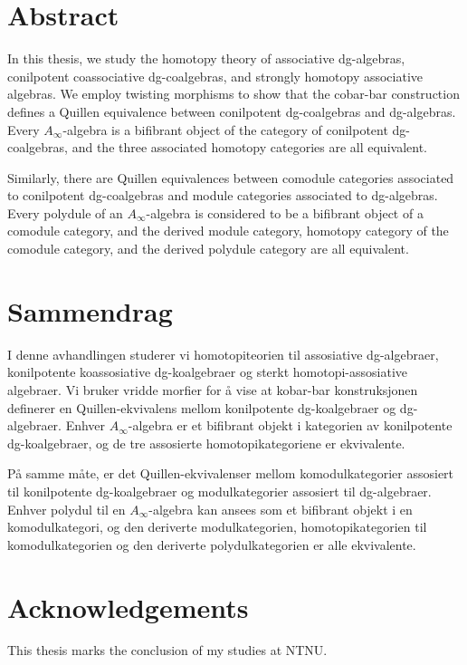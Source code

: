 \documentclass[../thesis.tex]{subfiles}
\begin{document}
    \chapter*{Abstract}
        In this thesis, we study the homotopy theory of associative dg-algebras, conilpotent coassociative dg-coalgebras, and strongly homotopy associative algebras. We employ twisting morphisms to show that the cobar-bar construction defines a Quillen equivalence between conilpotent dg-coalgebras and dg-algebras. Every $A_\infty$-algebra is a bifibrant object of the category of conilpotent dg-coalgebras, and the three associated homotopy categories are all equivalent.

        Similarly, there are Quillen equivalences between comodule categories associated to conilpotent dg-coalgebras and module categories associated to dg-algebras. Every polydule of an $A_\infty$-algebra is considered to be a bifibrant object of a comodule category, and the derived module category, homotopy category of the comodule category, and the derived polydule category are all equivalent.

    \chapter*{Sammendrag}
        I denne avhandlingen studerer vi homotopiteorien til assosiative dg-algebraer, konilpotente koassosiative dg-koalgebraer og sterkt homotopi-assosiative algebraer. Vi bruker vridde morfier for å vise at kobar-bar konstruksjonen definerer en Quillen-ekvivalens mellom konilpotente dg-koalgebraer og dg-algebraer. Enhver $A_\infty$-algebra er et bifibrant objekt i kategorien av konilpotente dg-koalgebraer, og de tre assosierte homotopikategoriene er ekvivalente.

        På samme måte, er det Quillen-ekvivalenser mellom komodulkategorier assosiert til konilpotente dg-koalgebraer og modulkategorier assosiert til dg-algebraer. Enhver polydul til en $A_\infty$-algebra kan ansees som et bifibrant objekt i en komodulkategori, og den deriverte modulkategorien, homotopikategorien til komodulkategorien og den deriverte polydulkategorien er alle ekvivalente.

    \newpage

    

    \chapter*{Acknowledgements}
        This thesis marks the conclusion of my studies at NTNU.
\end{document}
